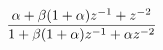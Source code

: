 \hsize 0pt
\vsize 0pt
\nopagenumbers
\overfullrule 0pt
\noindent
$$
{
\alpha + \beta(1 + \alpha)z^{-1} + z^{-2}
\over
1 + \beta(1 + \alpha)z^{-1} + \alpha z^{-2}
}
$$
\bye